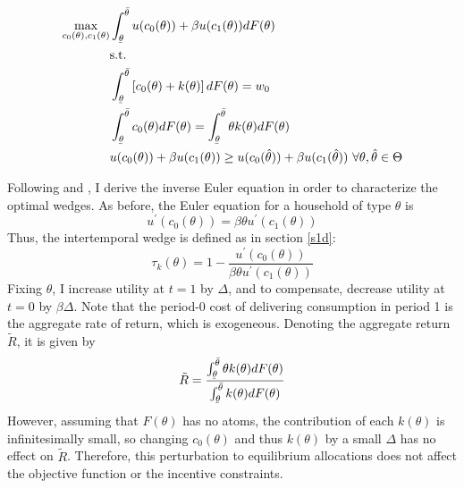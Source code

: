 \documentclass[11pt]{article}
\newcommand{\ubar}[1]{\underaccent{\bar}{#1}}
\newcommand{\p}{\prime}
\begin{document}
\begin{align}
    \max_{c_0(\theta), c_1(\theta)} &\int_{\ubar{\theta}}^{\bar{\theta}} u(c_0(\theta)) + \beta u(c_1(\theta))dF(\theta) \label{obj} \\
    &\text{s.t.} \notag \\
    &\int_{\ubar{\theta}}^{\bar{\theta}} \left[ c_0(\theta) + k(\theta) \right]dF(\theta) = w_0 \label{rc1} \\
    &\int_{\ubar{\theta}}^{\bar{\theta}} c_0(\theta)dF(\theta) = \int_{\ubar{\theta}}^{\bar{\theta}}\theta k(\theta)dF(\theta) \label{rc2} \\
    & u(c_0(\theta)) + \beta u(c_1(\theta)) \geq u(c_0(\hat{\theta})) + \beta u(c_1(\hat{\theta})) \text{ } \forall \theta, \hat{\theta}\in\Theta \label{icc_start}
\end{align}

Following \cite{golosov2006new} and \cite{kocherlakota2010new}, I derive the inverse Euler equation in order to characterize the optimal wedges. As before, the Euler equation for a household of type \( \theta \) is 
\[u^\p(c_0(\theta)) = \beta\theta u^\p(c_1(\theta))\]
Thus, the intertemporal wedge is defined as in section \ref{s1d}:
\[\tau_k(\theta) = 1 - \frac{u^\p(c_0(\theta))}{\beta\theta u^\p(c_1(\theta))}\]
Fixing \( \theta \), I increase utility at \( t = 1 \) by \( \Delta \), and to compensate, decrease utility at \( t = 0 \) by \( \beta\Delta \). Note that the period-0 cost of delivering consumption in period 1 is the aggregate rate of return, which is exogeneous. Denoting the aggregate return \( \tilde{R} \), it is given by 
\begin{equation}
    \tilde{R} = \frac{\int_{\ubar{\theta}}^{\bar{\theta}} \theta k(\theta)dF(\theta)}{\int_{\ubar{\theta}}^{\bar{\theta}} k(\theta)dF(\theta)} \label{aggr}
\end{equation}
However, assuming that \( F(\theta) \) has no atoms, the contribution of each \( k(\theta) \) is infinitesimally small, so changing \( c_0(\theta) \) and thus \( k(\theta) \) by a small \( \Delta \) has no effect on \( \tilde{R} \). Therefore, this perturbation to equilibrium allocations does not affect the objective function or the incentive constraints. 
\end{document}
